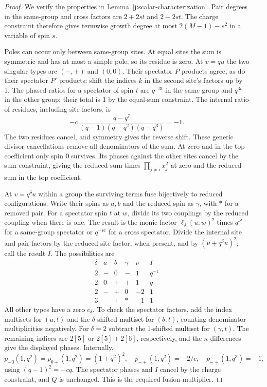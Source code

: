 \begin{proof}
We verify the properties in Lemma~\ref{j:scalar-characterization}.
Pair degrees in the same-group and cross factors are $2+2st$ and
$2-2st$. The charge constraint therefore gives termwise growth degree
at most $2(M-1)-s^2$ in a variable of spin $s$.

Poles can occur only between same-group sites. At equal sites the sum
is symmetric and has at most a simple pole, so its residue is zero.
At $v=qu$ the two singular types are $(-,+)$ and $(0,0)$. Their
spectator $P$ products agree, as do their spectator $P'$ products:
shift the indices $k$ in the second site's factors up by 1. The
phased ratios for a spectator of spin $t$ are $q^{-3t}$ in the same
group and $q^{3t}$ in the other group; their total is 1 by the
equal-sum constraint. The internal ratio of residues, including
site factors, is
\[
-c\,\frac{q-q^7}{(q-1)(q-q^2)(q-q^3)}=-1.
\]
The two residues cancel, and symmetry gives the reverse shift.
These generic divisor cancellations remove all denominators of the
sum. At zero and in the top coefficient only spin 0 survives.
Its phases against the other sites cancel by the sum constraint,
giving the reduced sum times $\prod_{j\ne i}x_j^2$ at zero and
the reduced sum in the top coefficient.

At $v=q^\delta u$ within a group the surviving terms fuse bijectively
to reduced configurations. Write their spins as $a,b$ and the
reduced spin as $\gamma$, with $*$ for a removed pair. For a spectator
spin $t$ at $w$, divide its two couplings by the reduced coupling when
there is one. The result is the monic factor $\ell_\delta(u,w)^2$
times $q^{\nu t}$ for a same-group spectator or $q^{-\nu t}$ for a
cross spectator. Divide the internal site and pair factors by the
reduced site factor, when present, and by $(u+q^\delta u)^2$; call
the result $I$. The possibilities are
\[
\begin{array}{c|cc|c|rc}
\delta&a&b&\gamma&\nu&I\\ \hline
2&-&0&-&1&q^{-1}\\
2&0&+&+&1&q\\
2&-&+&0&-2&1\\
3&-&+&*&-1&1
\end{array}
\]
All other types have a zero $e_\delta$. To check the spectator factors,
add the index multisets for $(a,t)$ and the $\delta$-shifted multiset
for $(b,t)$, counting denominator multiplicities negatively. For
$\delta=2$ subtract the 1-shifted multiset for $(\gamma,t)$. The
remaining indices are $2[5]$ or $2[5]+2[6]$, respectively, and the
$\kappa$ differences give the displayed phases. Internally,
\[
p_{-0}(1,q^2)=p_{0+}(1,q^2)=(1+q^2)^2,\quad
p_{-+}(1,q^2)=-2/c,\quad p_{-+}(1,q^3)=-1,
\]
using $(q-1)^2=-cq$. The spectator phases and $I$ cancel by the
charge constraint, and $Q$ is unchanged. This is the required fusion
multiplier.


\end{proof}
